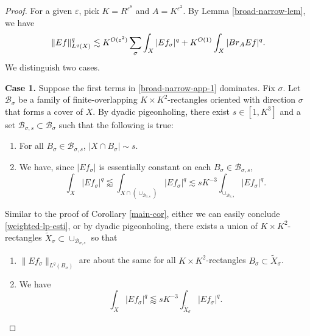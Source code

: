 \documentclass[10pt,a4paper]{amsart}
\newcommand{\BR}{{\rm{Br}}}
\newcommand{\cb}{\mathcal B}
\newcommand{\e}{\varepsilon}
\newcommand{\si}{\sigma}
\newcommand{\wt}{\widetilde}
\begin{document}
\begin{proof}
For a given $\e$, pick $K=R^{\e^8}$ and $A=K^{\e^2}$.
By Lemma \ref{broad-narrow-lem}, we have
\begin{equation}
\label{broad-narrow-app-1}
    \|Ef\|_{L^q(X)}^q\lesssim K^{O(\e^2)}\sum_\si\int_X|Ef_\si|^q+K^{O(1)}\int_X|\BR_A Ef|^q.
\end{equation}
We distinguish two cases.

\smallskip

{\bf Case 1.} Suppose the first terms in \eqref{broad-narrow-app-1} dominates.
Fix $\si$.
Let $\cb_\si$ be a family of finite-overlapping $K\times K^2$-rectangles oriented with direction $\si$ that forms a cover of $X$.
By dyadic pigeonholing, there exist $s\in[1,K^3]$ and a set $\cb_{\si,s}\subset \cb_\si$ such that the following is true:
\begin{enumerate}
    \item For all $B_\si\in\cb_{\si,s}$, $|X\cap B_\si|\sim s$.
    \item
    We have, since $|Ef_\si|$ is essentially constant on each $B_\si\in\cb_{\si,s}$,
    \begin{equation}
        \int_X|Ef_\si|^q\lessapprox \int_{X\cap (\cup_{\cb_{\si,s}})}|Ef_\si|^q\lesssim sK^{-3}\int_{\cup_{\cb_{\si,s}}}|Ef_\si|^q.
    \end{equation}
\end{enumerate}
Similar to the proof of Corollary \ref{main-cor}, either we can easily conclude \eqref{weighted-lp-esti}, or by dyadic pigeonholing, there exists a union of $K\times K^2$-rectangles $\wt X_\si\subset\cup_{\cb_{\si,s}}$ so that 
\begin{enumerate}
    \item $\|Ef_\si\|_{L^q(B_\si)}$ are about the same for all $K\times K^2$-rectangles $B_\si\subset \wt X_\si$.
    \item We have
    \begin{equation}
    \label{uniform-in-K-rect}
        \int_X|Ef_\si|^q\lessapprox sK^{-3}\int_{\wt X_\si}|Ef_\si|^q.
    \end{equation}
\end{enumerate}



\end{proof}
\end{document}
